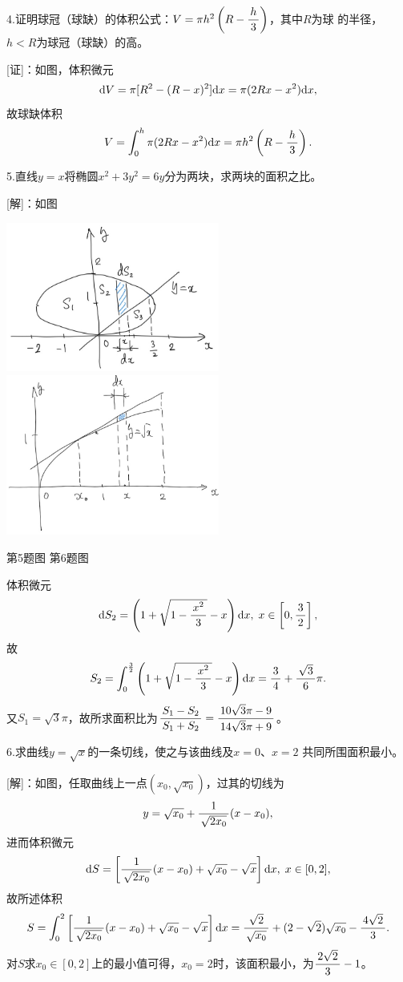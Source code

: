 \bs

4.证明球冠（球缺）的体积公式：$V=\pi h^2\left(R-\displaystyle\frac{\,{h}\,}{\,{3}\,}\right)$，其中$R$为球
的半径，$h<R$为球冠（球缺）的高。

[证]：如图，体积微元
$$\mathrm{d} V=\pi[R^2-(R-x)^2]\mathrm{d} x=\pi(2Rx-x^2)\mathrm{d} x,$$
故球缺体积
$$V=\displaystyle\int_0^h\pi(2Rx-x^2)\mathrm{d} x=\pi h^2\left(R-\displaystyle\frac{\,{h}\,}{\,{3}\,}\right).$$
\fin

\bs

5.直线$y=x$将椭圆$x^2+3y^2=6y$分为两块，求两块的面积之比。

[解]：如图
\begin{center}
	\includegraphics[width=7cm]{./images/ch6/ecXY.jpg}
	\includegraphics[width=7cm]{./images/ch6/ySqtXx.jpg}
	
	{\kaishu 第5题图\hspace{7cm} 第6题图}
\end{center}
体积微元
$$\mathrm{d} S_2=\left(1+\sqrt{1-\displaystyle\frac{\,{x^2}\,}{\,{3}\,}}-x\right)\mathrm{d} x,\;x\in\left[0,\displaystyle\frac{\,{3}\,}{\,{2}\,}\right],$$
故
$$S_2=\displaystyle\int_0^{\frac32}\left(1+\sqrt{1-\displaystyle\frac{\,{x^2}\,}{\,{3}\,}}-x\right)\mathrm{d} x
=\displaystyle\frac{\,{3}\,}{\,{4}\,}+\displaystyle\frac{\,{\sqrt3}\,}{\,{6}\,}\pi.$$
又$S_1=\sqrt3\pi$，故所求面积比为$\displaystyle\frac{\,{S_1-S_2}\,}{\,{S_1+S_2}\,}=\displaystyle\frac{\,{10\sqrt3\pi-9}\,}{\,{14\sqrt3\pi+9}\,}$。
\fin

6.求曲线$y=\sqrt x$的一条切线，使之与该曲线及$x=0$、$x=2$
共同所围面积最小。

[解]：如图，任取曲线上一点$(x_0,\sqrt{x_0})$，过其的切线为
$$y=\sqrt{x_0}+\displaystyle\frac{\,{1}\,}{\,{\sqrt{2x_0}}\,}(x-x_0),$$
进而体积微元
$$\mathrm{d} S=\left[\displaystyle\frac{\,{1}\,}{\,{\sqrt{2x_0}}\,}(x-x_0)+\sqrt{x_0}-\sqrt{x}\right]\mathrm{d}
x,\;x\in[0,2],$$ 故所述体积
$$S=\displaystyle\int_0^2\left[\displaystyle\frac{\,{1}\,}{\,{\sqrt{2x_0}}\,}(x-x_0)+\sqrt{x_0}-\sqrt{x}\right]\mathrm{d}
x=\displaystyle\frac{\,{\sqrt2}\,}{\,{\sqrt{x_0}}\,}+(2-\sqrt2)\sqrt{x_0}-\displaystyle\frac{\,{4\sqrt2}\,}{\,{3}\,}.$$
对$S$求$x_0\in[0,2]$上的最小值可得，$x_0=2$时，该面积最小，为$\displaystyle\frac{\,{2\sqrt2}\,}{\,{3}\,}-1$。
\fin

